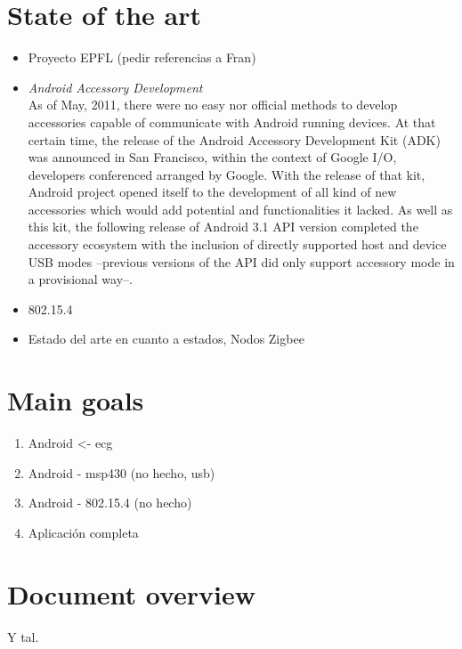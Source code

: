 	\section{State of the art}
		\begin{itemize}
			\item Proyecto EPFL (pedir referencias a Fran)
			\item \emph{Android Accessory Development}\\
				As of May, 2011, there were no easy nor official methods to develop
				accessories capable of communicate with Android running devices. At that
				certain time, the release of the Android Accessory Development Kit (ADK)
				was announced in San Francisco, within the context of Google I/O, developers
				conferenced arranged by Google.
				With the release of that kit, Android project opened itself to the development
				of all kind of new accessories which would add potential and functionalities
				it lacked.
				As well as this kit, the following release of Android 3.1 API version completed
				the accessory ecosystem with the inclusion of directly supported host and device
				USB modes --previous versions of the API did only support accessory mode in a 
				provisional way--.
			\item 802.15.4
			\item Estado del arte en cuanto a estados, Nodos Zigbee
		\end{itemize}
	\section{Main goals}
		\begin{enumerate}
			\item Android <- ecg
			\item Android - msp430 (no hecho, usb)
			\item Android - 802.15.4 (no hecho)
			\item Aplicación completa
		\end{enumerate}
	\section{Document overview}
		Y tal.
		
		

